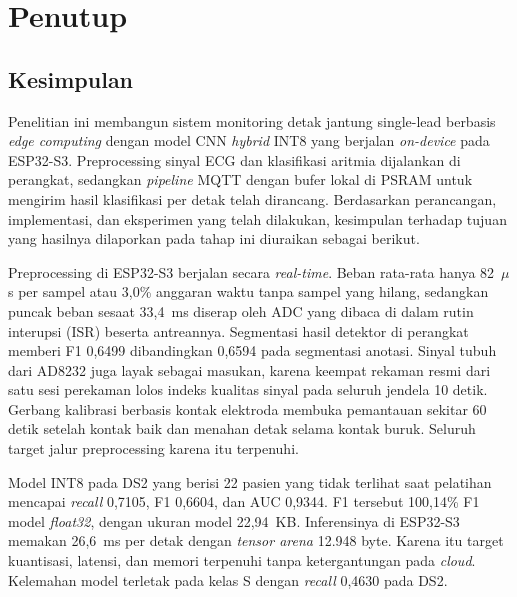 \chapter{Penutup}

\section{Kesimpulan}

Penelitian ini membangun sistem monitoring detak jantung single-lead berbasis \textit{edge computing} dengan model CNN \textit{hybrid} INT8 yang berjalan \textit{on-device} pada ESP32-S3. Preprocessing sinyal ECG dan klasifikasi aritmia dijalankan di perangkat, sedangkan \textit{pipeline} MQTT dengan bufer lokal di PSRAM untuk mengirim hasil klasifikasi per detak telah dirancang. Berdasarkan perancangan, implementasi, dan eksperimen yang telah dilakukan, kesimpulan terhadap tujuan yang hasilnya dilaporkan pada tahap ini diuraikan sebagai berikut.

Preprocessing di ESP32-S3 berjalan secara \textit{real-time}. Beban rata-rata hanya 82~$\mu$s per sampel atau 3,0\% anggaran waktu tanpa sampel yang hilang, sedangkan puncak beban sesaat 33,4~ms diserap oleh ADC yang dibaca di dalam rutin interupsi (ISR) beserta antreannya. Segmentasi hasil detektor di perangkat memberi F1 0,6499 dibandingkan 0,6594 pada segmentasi anotasi. Sinyal tubuh dari AD8232 juga layak sebagai masukan, karena keempat rekaman resmi dari satu sesi perekaman lolos indeks kualitas sinyal pada seluruh jendela 10 detik. Gerbang kalibrasi berbasis kontak elektroda membuka pemantauan sekitar 60 detik setelah kontak baik dan menahan detak selama kontak buruk. Seluruh target jalur preprocessing karena itu terpenuhi.

Model INT8 pada DS2 yang berisi 22 pasien yang tidak terlihat saat pelatihan mencapai \textit{recall} 0,7105, F1 0,6604, dan AUC 0,9344. F1 tersebut 100,14\% F1 model \textit{float32}, dengan ukuran model 22,94~KB. Inferensinya di ESP32-S3 memakan 26,6~ms per detak dengan \textit{tensor arena} 12.948 byte. Karena itu target kuantisasi, latensi, dan memori terpenuhi tanpa ketergantungan pada \textit{cloud}. Kelemahan model terletak pada kelas S dengan \textit{recall} 0,4630 pada DS2.

